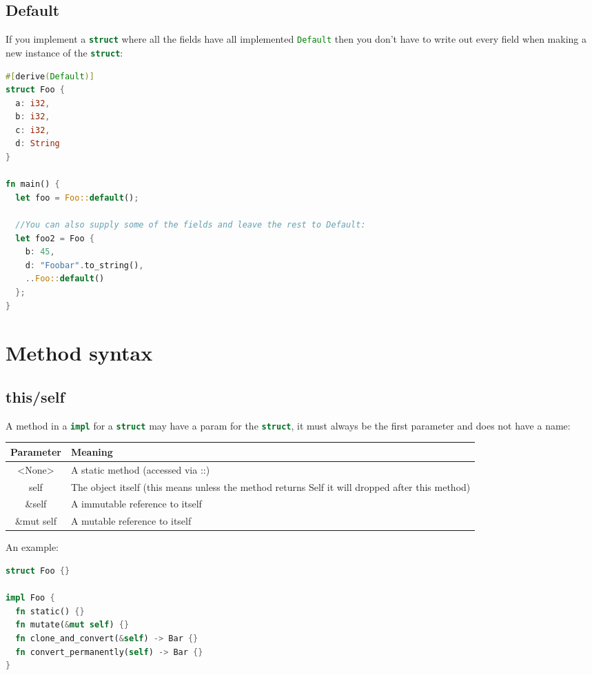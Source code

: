 \documentclass[a4paper,11pt]{article}
\begin{document}
\newpage
\subsection{Default}

If you implement a \lstinline[language=Rust]{struct} where all the fields have all implemented \lstinline[language=Rust]{Default} then you don't have to write out every field when making a new instance of the \lstinline[language=Rust]{struct}:

\begin{lstlisting}[language=Rust,frame=single]
#[derive(Default)]
struct Foo {
  a: i32,
  b: i32,
  c: i32,
  d: String
}

fn main() {
  let foo = Foo::default();

  //You can also supply some of the fields and leave the rest to Default:
  let foo2 = Foo {
    b: 45,
    d: "Foobar".to_string(),
    ..Foo::default()
  };
}
\end{lstlisting}

\newpage
\section{Method syntax}
\subsection{this/self}

A method in a \lstinline[language=Rust]{impl} for a \lstinline[language=Rust]{struct} may have a param for the \lstinline[language=Rust]{struct}, it must always be the first parameter and does not have a name:
\begin{center}
\begin{tabular}{ |c|p{12cm}| } 
 \hline
 Parameter & Meaning \\ 
 \hline
 <None> & A static method (accessed via ::) \\
 self & The object itself (this means unless the method returns Self it will dropped after this method) \\ 
 \&self  & A immutable reference to itself \\ 
 \&mut self & A mutable reference to itself \\ 
 \hline
\end{tabular}
\end{center}

An example:
\begin{lstlisting}[language=Rust,frame=single]
struct Foo {}

impl Foo {
  fn static() {}
  fn mutate(&mut self) {}
  fn clone_and_convert(&self) -> Bar {}
  fn convert_permanently(self) -> Bar {}
}
\end{lstlisting}
\end{document}
